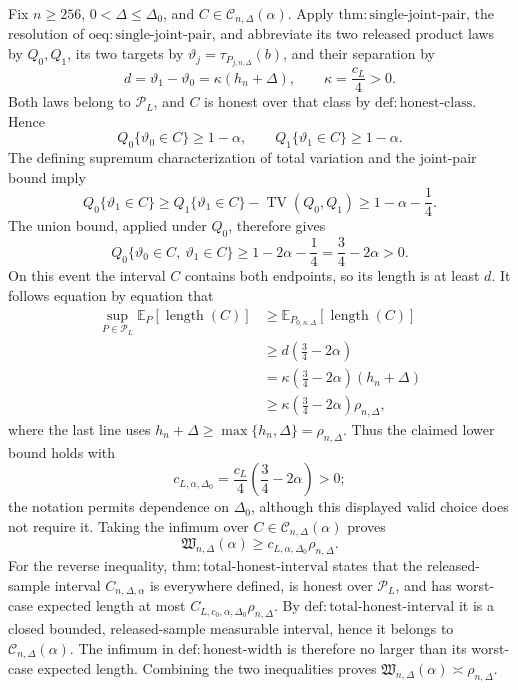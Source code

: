 Fix \(n\ge256\), \(0<\Delta\le\Delta_0\), and \(C\in\mathcal C_{n,\Delta}(\alpha)\).  Apply \(\mathrm{thm:single\text{-}joint\text{-}pair}\), the resolution of \(\mathrm{oeq:single\text{-}joint\text{-}pair}\), and abbreviate its two released product laws by \(Q_0,Q_1\), its two targets by \(\vartheta_j=\tau_{P_{j,n,\Delta}}(b)\), and their separation by
\[
 d=\vartheta_1-\vartheta_0
 =\kappa(h_n+\Delta),
 \qquad \kappa=\frac{c_L}{4}>0.
\]
Both laws belong to \(\mathcal P_L\), and \(C\) is honest over that class by \(\mathrm{def:honest\text{-}class}\).  Hence
\[
 Q_0\{\vartheta_0\in C\}\ge1-\alpha,
 \qquad
 Q_1\{\vartheta_1\in C\}\ge1-\alpha.
\]
The defining supremum characterization of total variation and the joint-pair bound imply
\[
 Q_0\{\vartheta_1\in C\}
 \ge Q_1\{\vartheta_1\in C\}-\operatorname{TV}(Q_0,Q_1)
 \ge1-\alpha-\frac14.
\]
The union bound, applied under \(Q_0\), therefore gives
\[
 Q_0\{\vartheta_0\in C,\ \vartheta_1\in C\}
 \ge1-2\alpha-\frac14
 =\frac34-2\alpha>0.
\]
On this event the interval \(C\) contains both endpoints, so its length is at least \(d\).  It follows equation by equation that
\[
 \begin{aligned}
 \sup_{P\in\mathcal P_L}\mathbb E_P[\operatorname{length}(C)]
 &\ge \mathbb E_{P_{0,n,\Delta}}[\operatorname{length}(C)]\\
 &\ge d\left(\frac34-2\alpha\right)\\
 &=\kappa\left(\frac34-2\alpha\right)(h_n+\Delta)\\
 &\ge\kappa\left(\frac34-2\alpha\right)\rho_{n,\Delta},
 \end{aligned}
\]
where the last line uses \(h_n+\Delta\ge\max\{h_n,\Delta\}=\rho_{n,\Delta}\).  Thus the claimed lower bound holds with
\[
 c_{L,\alpha,\Delta_0}
 =\frac{c_L}{4}\left(\frac34-2\alpha\right)>0;
\]
the notation permits dependence on \(\Delta_0\), although this displayed valid choice does not require it.  Taking the infimum over \(C\in\mathcal C_{n,\Delta}(\alpha)\) proves
\[
 \mathfrak W_{n,\Delta}(\alpha)
 \ge c_{L,\alpha,\Delta_0}\rho_{n,\Delta}.
\]
For the reverse inequality, \(\mathrm{thm:total\text{-}honest\text{-}interval}\) states that the released-sample interval \(C_{n,\Delta,\alpha}\) is everywhere defined, is honest over \(\mathcal P_L\), and has worst-case expected length at most \(C_{L,c_0,\alpha,\Delta_0}\rho_{n,\Delta}\).  By \(\mathrm{def:total\text{-}honest\text{-}interval}\) it is a closed bounded, released-sample measurable interval, hence it belongs to \(\mathcal C_{n,\Delta}(\alpha)\).  The infimum in \(\mathrm{def:honest\text{-}width}\) is therefore no larger than its worst-case expected length.  Combining the two inequalities proves \(\mathfrak W_{n,\Delta}(\alpha)\asymp\rho_{n,\Delta}\).